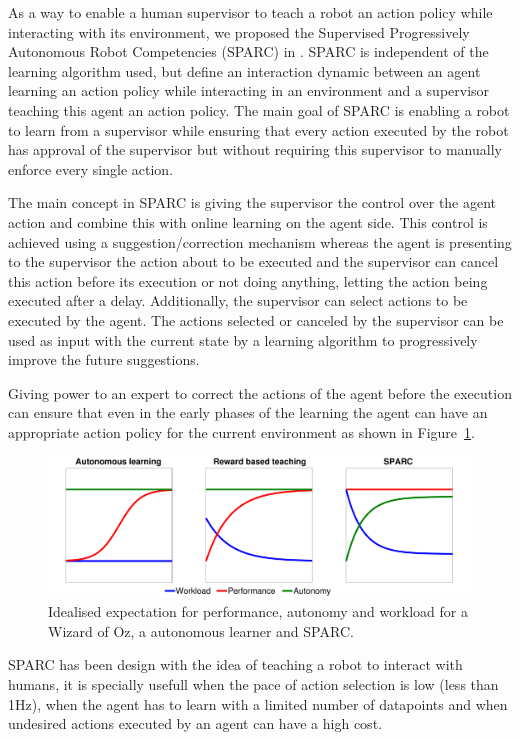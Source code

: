 \documentclass[letterpaper]{article} %
\begin{document}
As a way to enable a human supervisor to teach a robot an action policy while
interacting with its environment, we proposed the Supervised Progressively
Autonomous Robot Competencies (SPARC) in \cite{senft2015sparc}. SPARC is independent
of the learning algorithm used, but define an interaction dynamic between an
agent learning an action policy while interacting in an environment and a
supervisor teaching this agent an action policy. The main goal of SPARC is
enabling a robot to learn from a supervisor while ensuring that every action
executed by the robot has approval of the supervisor but without requiring this
supervisor to manually enforce every single action.

The main concept in SPARC is giving the supervisor the control over the agent
action and combine this with online learning on the agent side. This control is
achieved using a suggestion/correction mechanism whereas the agent is presenting
to the supervisor the action about to be executed and the supervisor can cancel
this action before its execution or not doing anything, letting the action being
executed after a delay. Additionally, the supervisor can select actions to be
executed by the agent. The actions selected or canceled by the supervisor can be
used as input with the current state by a learning algorithm to progressively
improve the future suggestions.

Giving power to an expert to correct the actions of the agent before the
execution can ensure that even in the early phases of the learning the agent can
have an appropriate action policy for the current environment as shown in Figure~\ref{fig:comparison}.

\begin{figure}
    \centering
    \includegraphics[width=0.9\linewidth]{./fig/motivation.pdf}
    \caption{Idealised expectation for performance, autonomy and workload for a
    Wizard of Oz, a autonomous learner and SPARC.}
    \label{fig:comparison}
\end{figure}

SPARC has been design with the idea of teaching a robot to interact with humans,
it is specially usefull when the pace of action selection is low (less than
1Hz), when the agent has to learn with a limited number of datapoints and when
undesired actions executed by an agent can have a high cost. 
\end{document}
